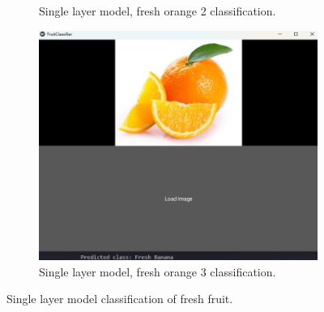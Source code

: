 \documentclass[conference]{IEEEtran}
\begin{document}
\begin{figure}[h]
\begin{subfigure}[b]{0.48\linewidth}
        \caption{Single layer model, fresh orange 2 classification.}
        \label{figFB}
    \end{subfigure}
    \hfill
    \begin{subfigure}[b]{0.48\linewidth}
        \centering
        \includegraphics[width=\linewidth]{1layer orage3.png}
        \caption{Single layer model, fresh orange 3 classification.}
        \label{figFB}
    \end{subfigure}
    \caption{Single layer model classification of fresh fruit.}
    \label{Fig1F}
\end{figure}
\end{document}
